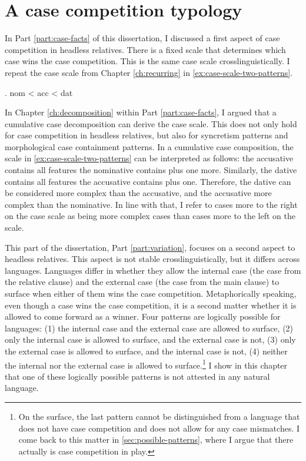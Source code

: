 
\chapter{A case competition typology}\label{ch:case-competition-typology}

In Part \ref{part:case-facts} of this dissertation, I discussed a first aspect of case competition in headless relatives. There is a fixed scale that determines which case wins the case competition. This is the same case scale crosslinguistically. I repeat the case scale from Chapter \ref{ch:recurring} in \ref{ex:case-scale-two-patterns}.

\ex. \ac{nom} < \ac{acc} < \ac{dat}\label{ex:case-scale-two-patterns}

In Chapter \ref{ch:decomposition} within Part \ref{part:case-facts}, I argued that a cumulative case decomposition can derive the case scale. This does not only hold for case competition in headless relatives, but also for syncretism patterns and morphological case containment patterns. In a cumulative case composition, the scale in \ref{ex:case-scale-two-patterns} can be interpreted as follows: the accusative contains all features the nominative contains plus one more. Similarly, the dative contains all features the accusative contains plus one. Therefore, the dative can be considered more complex than the accusative, and the accusative more complex than the nominative. In line with that, I refer to cases more to the right on the case scale as being more complex cases than cases more to the left on the scale.

This part of the dissertation, Part \ref{part:variation}, focuses on a second aspect to headless relatives. This aspect is not stable crosslinguistically, but it differs across languages. Languages differ in whether they allow the internal case (the case from the relative clause) and the external case (the case from the main clause) to surface when either of them wins the case competition. Metaphorically speaking, even though a case wins the case competition, it is a second matter whether it is allowed to come forward as a winner. Four patterns are logically possible for languages: (1) the internal case and the external case are allowed to surface, (2) only the internal case is allowed to surface, and the external case is not, (3) only the external case is allowed to surface, and the internal case is not, (4) neither the internal nor the external case is allowed to surface.\footnote{
On the surface, the last pattern cannot be distinguished from a language that does not have case competition and does not allow for any case mismatches. I come back to this matter in \ref{sec:possible-patterns}, where I argue that there actually is case competition in play.
}
I show in this chapter that one of these logically possible patterns is not attested in any natural language.

